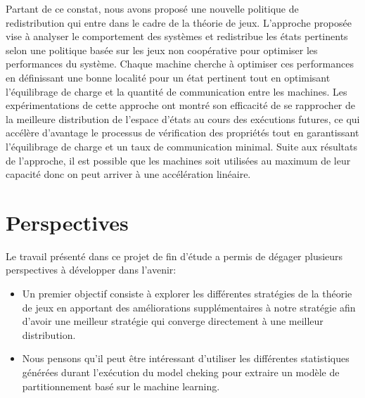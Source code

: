 Partant de ce constat, nous avons proposé une nouvelle politique de redistribution qui entre dans le cadre de la théorie de jeux. L'approche proposée vise à analyser le comportement des systèmes et redistribue les états pertinents selon une politique basée sur les jeux non coopérative pour optimiser les performances du système. Chaque machine cherche à optimiser ces performances en définissant une bonne localité pour un état pertinent tout en optimisant l’équilibrage de charge et la quantité de communication entre les machines. Les expérimentations de cette approche ont montré son efficacité de se rapprocher de la meilleure distribution de l’espace d’états au cours des exécutions futures, ce qui accélère d’avantage le processus de vérification des propriétés tout en garantissant l’équilibrage de  charge et un taux de communication minimal. Suite aux résultats de l'approche, il est possible que les machines soit utilisées au maximum de leur capacité donc on peut arriver à une accélération linéaire.

\section*{Perspectives}
Le travail présenté dans ce projet de fin d'étude a permis de dégager plusieurs perspectives à développer dans l’avenir:
\begin{itemize}
	\item Un premier objectif consiste à explorer les différentes stratégies de la théorie de jeux en apportant des améliorations supplémentaires à notre stratégie afin d’avoir une meilleur stratégie qui converge directement à une meilleur distribution.
	\item Nous pensons qu’il peut être intéressant d'utiliser les différentes statistiques générées durant l'exécution du model cheking pour  extraire un modèle de partitionnement basé sur le machine learning.
\end{itemize}
